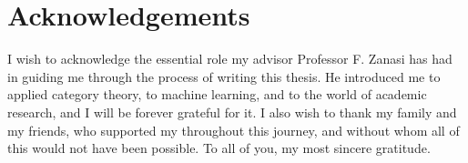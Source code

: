 \documentclass[11pt,a4paper,openright,twoside]{report}
\theoremstyle{plain}
\theoremstyle{definition}
\begin{document}


{}



\clearpage{\pagestyle{empty}\cleardoublepage}





\chapter*{Acknowledgements}

\thispagestyle{empty}

I wish to acknowledge the essential role my advisor Professor F. Zanasi has had in guiding me through the process of writing this thesis. He introduced me to applied category theory, to machine learning, and to the world of academic research, and I will be forever grateful for it. I also wish to thank my family and my friends, who supported my throughout this journey, and without whom all of this would not have been possible. To all of you, my most sincere gratitude.
\end{document}
